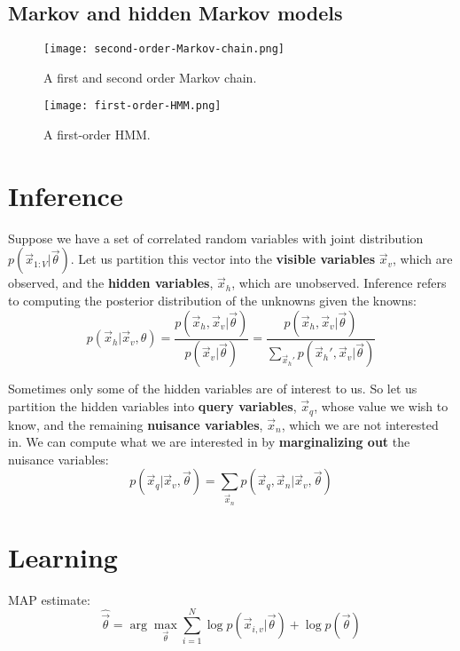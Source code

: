 \subsection{Markov and hidden Markov models}
\begin{figure}[hbtp]
\centering
    \texttt{[image: second-order-Markov-chain.png]}
\caption{A first and second order Markov chain.}
\label{fig:second-order-Markov-chain} 
\end{figure}

\begin{figure}[hbtp]
\centering
    \texttt{[image: first-order-HMM.png]}
\caption{A first-order HMM.}
\label{fig:first-order-HMM} 
\end{figure}



\section{Inference}
Suppose we have a set of correlated random variables with joint distribution $p(\vec{x}_{1:V}|\vec{\theta})$. Let us partition this vector into the \textbf{visible variables} $\vec{x}_v$, which are observed, and the \textbf{hidden variables}, $\vec{x}_h$, which are unobserved. Inference refers to computing the posterior distribution of the unknowns given the knowns:
\begin{equation}
p(\vec{x}_h|\vec{x}_v,\theta) = \frac{p(\vec{x}_h, \vec{x}_v|\vec{\theta})}{p(\vec{x}_v|\vec{\theta})}=\frac{p(\vec{x}_h, \vec{x}_v|\vec{\theta})}{\sum_{\vec{x}_h'}p(\vec{x}_h', \vec{x}_v|\vec{\theta})}
\end{equation}

Sometimes only some of the hidden variables are of interest to us. So let us partition the hidden variables into \textbf{query variables}, $\vec{x}_q$, whose value we wish to know, and the remaining \textbf{nuisance variables}, $\vec{x}_n$, which we are not interested in. We can compute what we are interested in by \textbf{marginalizing out} the nuisance variables:
\begin{equation}
p(\vec{x}_q|\vec{x}_v,\vec{\theta}) = \sum_{\vec{x}_n}p(\vec{x}_q, \vec{x}_n|\vec{x}_v, \vec{\theta})
\end{equation}


\section{Learning}
MAP estimate:
\begin{equation}
\hat{\vec{\theta}} =\arg\max_{\vec{\theta}}\sum\limits_{i=1}^N \log p(\vec{x}_{i,v}|\vec{\theta})+\log p(\vec{\theta})
\end{equation}


